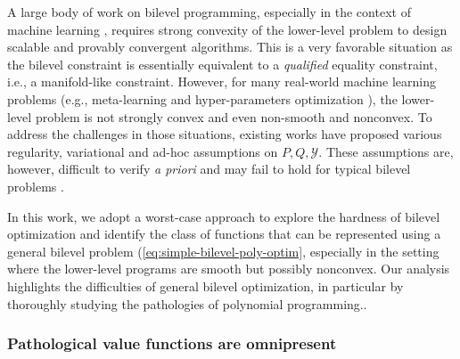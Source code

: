 \documentclass{article}
\newcommand*{\cY}{\mathcal{Y}}
\theoremstyle{plain}
\theoremstyle{definition}
\begin{document}
A large body of work on bilevel programming, especially in the context of machine learning \cite{Dagreou2022SABA,Dagreou2023SRBA,Liu2022investigating,gould2016differentiating,ablin2020super-efficiency,Blondel2021EfficientAM,arbel2022amortized,ji2020BilevelOC}, requires strong convexity of the lower-level problem to design scalable and provably convergent algorithms. This is a very favorable situation as the bilevel constraint is essentially equivalent to a {\em qualified} equality constraint, i.e., a manifold-like constraint. However, for many real-world machine learning problems (e.g., meta-learning and hyper-parameters optimization \cite{Franceschi2018BilevelPF}), the lower-level problem is not strongly convex and even non-smooth and nonconvex. To address the challenges in those situations, existing works \cite{liu2021towards,liu2021valuefunction,arbel:hal-03869097,guihua2014solving,Mordukhovich2020,ye1995optimality,dempe2012sensitivity,liu2020generic} have proposed various regularity, variational and ad-hoc assumptions on $P,Q,\cY$. These assumptions are, however, difficult to verify \textit{a priori} and may fail to hold for typical bilevel problems \cite[Section 3.2]{hendrion2011calmness}.  

In this work, we adopt a worst-case approach to explore the hardness of bilevel optimization and identify the class of functions that can be represented using a general bilevel problem (\eqref{eq:simple-bilevel-poly-optim}, especially in the setting where the lower-level programs are smooth but possibly nonconvex. Our analysis highlights the difficulties of general bilevel optimization, {in particular by thoroughly studying the pathologies of polynomial programming.}.%

\subsubsection*{Pathological value functions are omnipresent}
\end{document}
